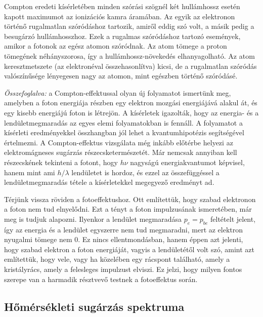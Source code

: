 \documentclass[a4paper,12pt]{article}
\begin{document}
Compton eredeti kísérletében minden szórási szögnél két hullámhossz esetén kapott maximumot az ionizációs kamra áramában. Az egyik az elektronon történő rugalmatlan szóródáshoz tartozik, amiről eddig szó volt, a másik pedig a besugárzó hullámhosszhoz. Ezek a rugalmas szóródáshoz tartozó események, amikor a fotonok az egész atomon szóródnak. Az atom tömege a proton tömegének néhányszorosa, így a hullámhossz-növekedés elhanyagolható.
Az atom keresztmetszete (az elektronéval összehasonlítva) kicsi, de a rugalmatlan szóródás valószínűsége lényegesen nagy az atomon, mint egészben történő szóródásé.

\textit{Összefoglalva:} a Compton-effektussal olyan új folyamatot ismertünk meg, amelyben a foton energiája részben egy elektron mozgási energiájává alakul át, és egy kisebb energiájú foton is létrejön. A kísérletek igazolták, hogy az energia- és a lendületmegmaradás az egyes elemi folyamatokban is fennáll.
A folyamatot a kísérleti eredményekkel összhangban jól lehet a kvantumhipotézis segítségével értelmezni. A Compton-effektus vizsgálata még inkább előtérbe helyezi az elektromágneses sugárzás részecsketermészetét. Már nemcsak annyiban kell részecskének tekinteni a fotont, hogy $h\nu$ nagyságú energiakvantumot képvisel, hanem mint ami $h/\lambda$ lendületet is hordoz, és ezzel az összefüggéssel a lendületmegmaradás tétele a kísérletekkel megegyező eredményt ad.

Térjünk vissza röviden a fotoeffektushoz. Ott említettük, hogy szabad elektronon a foton nem tud elnyelődni. Ezt a tényt a foton impulzusának ismeretében, már meg is tudjuk alapozni. Ilyenkor a lendület megmaradása 
$p_e = p_{be}$
feltételt jelent, így az energia és a lendület egyszerre nem tud megmaradni, mert az elektron nyugalmi tömege nem 0. Ez nincs ellentmondásban, hanem éppen azt jelenti, hogy szabad elektron a foton energiáját, vagyis a lendületétől volt szó, amint azt említettük, hogy vele, vagy ha közelében egy rácspont található, amely a kristályrács, amely a felesleges impulzust elviszi. Ez jelzi, hogy milyen fontos szerepe van a harmadik résztvevő testnek a fotoeffektus során.

\subsection{Hőmérsékleti sugárzás spektruma}
\end{document}

